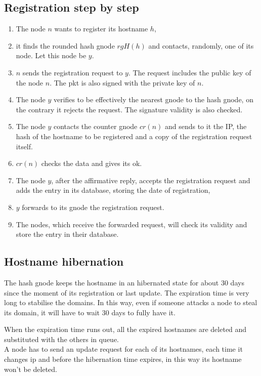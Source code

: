 \documentclass[a4paper]{article}
\begin{document}
\subsection{Registration step by step} 
\begin{enumerate}
	\item The node $n$ wants to register its hostname $h$,
	\item it finds the rounded hash gnode $rgH(h)$ and contacts, randomly,
		one of its node. Let this node be $y$.
	\item $n$ sends the registration request to $y$. The request includes
		the public key of the node $n$. The pkt is also signed with
		the private key of $n$.
	\item The node $y$ verifies to be effectively the nearest gnode to the
		hash gnode, on the contrary it rejects the request.
		The signature validity is also checked.
	\item The node $y$ contacts the counter gnode $cr(n)$ and sends to it
		the IP, the hash of the hostname to be registered and a copy of
		the registration request itself.
	\item $cr(n)$ checks the data and gives its ok.
	\item The node $y$, after the affirmative reply, accepts the
		registration request and adds the entry in its database,
		storing the date of registration,
	\item $y$ forwards to its gnode the registration request.
	\item The nodes, which receive the forwarded request, will check its
		validity and store the entry in their database.
\end{enumerate}
  
\subsection{Hostname hibernation}

The hash gnode keeps the hostname in an hibernated state for about 30 days
since the moment of its registration or last update.
The expiration time is very long to stabilise the domains. In this way, even
if someone attacks a node to steal its domain, it will have to wait 30 days
to fully have it.

When the expiration time runs out, all the expired hostnames are deleted and
substituted with the others in queue.\\
A node has to send an update request for each of its hostnames, each time it
changes ip and before the hibernation time expires, in this way its
hostname won't be deleted.
\end{document}

